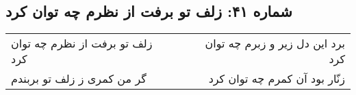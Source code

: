 \begin{center}
\section*{شماره ۴۱: زلف تو برفت از نظرم چه توان کرد}
\label{sec:041}
\begin{longtable}{l p{0.5cm} r}
زلف تو برفت از نظرم چه توان کرد
&&
برد این دل زیر و زبرم چه توان کرد
\\
گر من کمری ز زلف تو بربندم
&&
زنّار بود آن کمرم چه توان کرد
\\
\end{longtable}
\end{center}
